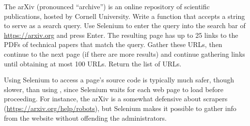 \begin{problem} %
The arXiv (pronounced ``archive'') is an online repository of scientific publications, hosted by Cornell University.
Write a function that accepts a string to serve as a search query.
Use Selenium to enter the query into the search bar of \url{https://arxiv.org} and press Enter.
The resulting page has up to 25 links to the PDFs of technical papers that match the query.
Gather these URLs, then continue to the next page (if there are more results) and continue gathering links until obtaining at most 100 URLs.
Return the list of URLs.
\end{problem}

\begin{info}
Using Selenium to access a page's source code is typically much safer, though slower, than using , since Selenium waits for each web page to load before proceeding.
For instance, the arXiv is a somewhat defensive about scrapers (\url{https://arxiv.org/help/robots}), but Selenium makes it possible to gather info from the website without offending the administrators.
\end{info}

\begin{comment} %
\begin{problem}
The NBA has live statistics \url{http://stats.nba.com/}.
Use Selenium to return a list of the \li{a} tags containing each of the 30 NBA teams.
Use the \li{find_all()} method in conjunction with whatever unique identifiers get you the correct tags.
\\(Hint: class and tag name are a good start). %

\begin{itemize}
\item The column titles are Name, HW\%, AW\%, where Name is each team name, HW\% is the Home Win \%, and AW\% is the Away Win \%.
\item Each row represents a different basketball team, with its home and away win percentages.
\end{itemize}
Hint: You will need to use Selenium to access each teams website using the links from the tags found in problem \ref{prob:scraping-bball}.
If the websites do not load properly, consider a \li{try-except} clause like the one suggested previously.
\end{problem}
\end{comment}

